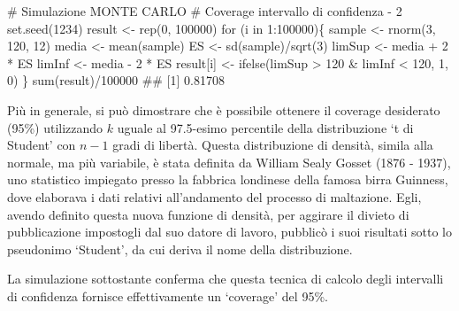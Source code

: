 \documentclass[a4paper,12pt,oneside]{book}
\newenvironment{Shaded}{\begin{snugshade}}{\end{snugshade}}
\newcommand{\DecValTok}[1]{#1}
\newcommand{\SpecialCharTok}[1]{#1}
\newcommand{\CommentTok}[1]{#1}
\newcommand{\DocumentationTok}[1]{#1}
\newcommand{\OtherTok}[1]{#1}
\newcommand{\FunctionTok}[1]{#1}
\newcommand{\ControlFlowTok}[1]{#1}
\newcommand{\NormalTok}[1]{#1}
\begin{document}
\begin{Shaded}
\begin{Highlighting}[]
\CommentTok{\# Simulazione MONTE CARLO}
\CommentTok{\# Coverage intervallo di confidenza {-} 2}
\FunctionTok{set.seed}\NormalTok{(}\DecValTok{1234}\NormalTok{)}
\NormalTok{result }\OtherTok{\textless{}{-}} \FunctionTok{rep}\NormalTok{(}\DecValTok{0}\NormalTok{, }\DecValTok{100000}\NormalTok{)}
\ControlFlowTok{for}\NormalTok{ (i }\ControlFlowTok{in} \DecValTok{1}\SpecialCharTok{:}\DecValTok{100000}\NormalTok{)\{}
\NormalTok{  sample }\OtherTok{\textless{}{-}} \FunctionTok{rnorm}\NormalTok{(}\DecValTok{3}\NormalTok{, }\DecValTok{120}\NormalTok{, }\DecValTok{12}\NormalTok{)}
\NormalTok{  media }\OtherTok{\textless{}{-}} \FunctionTok{mean}\NormalTok{(sample)}
\NormalTok{  ES }\OtherTok{\textless{}{-}} \FunctionTok{sd}\NormalTok{(sample)}\SpecialCharTok{/}\FunctionTok{sqrt}\NormalTok{(}\DecValTok{3}\NormalTok{)}
\NormalTok{  limSup }\OtherTok{\textless{}{-}}\NormalTok{ media }\SpecialCharTok{+} \DecValTok{2} \SpecialCharTok{*}\NormalTok{ ES}
\NormalTok{  limInf }\OtherTok{\textless{}{-}}\NormalTok{ media }\SpecialCharTok{{-}} \DecValTok{2} \SpecialCharTok{*}\NormalTok{ ES}
\NormalTok{  result[i] }\OtherTok{\textless{}{-}} \FunctionTok{ifelse}\NormalTok{(limSup }\SpecialCharTok{\textgreater{}} \DecValTok{120} \SpecialCharTok{\&}\NormalTok{ limInf }\SpecialCharTok{\textless{}} \DecValTok{120}\NormalTok{, }\DecValTok{1}\NormalTok{, }\DecValTok{0}\NormalTok{)}
\NormalTok{\}}
\FunctionTok{sum}\NormalTok{(result)}\SpecialCharTok{/}\DecValTok{100000}
\DocumentationTok{\#\# [1] 0.81708}
\end{Highlighting}
\end{Shaded}

Più in generale, si può dimostrare che è possibile ottenere il coverage desiderato (95\%) utilizzando \(k\) uguale al 97.5-esimo percentile della distribuzione `t di Student' con \(n - 1\) gradi di libertà. Questa distribuzione di densità, simila alla normale, ma più variabile, è stata definita da William Sealy Gosset (1876 - 1937), uno statistico impiegato presso la fabbrica londinese della famosa birra Guinness, dove elaborava i dati relativi all'andamento del processo di maltazione. Egli, avendo definito questa nuova funzione di densità, per aggirare il divieto di pubblicazione impostogli dal suo datore di lavoro, pubblicò i suoi risultati sotto lo pseudonimo `Student', da cui deriva il nome della distribuzione.

La simulazione sottostante conferma che questa tecnica di calcolo degli intervalli di confidenza fornisce effettivamente un `coverage' del 95\%.
\end{document}

